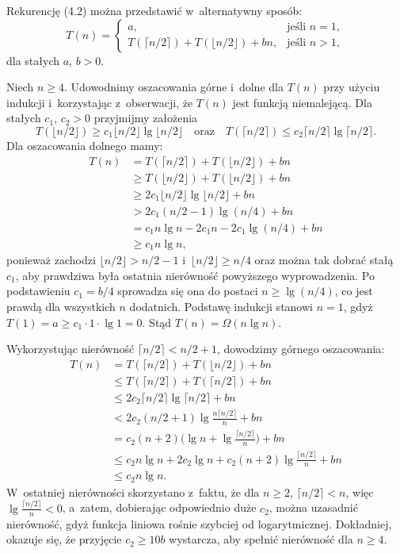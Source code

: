 \exercise %
Rekurencję (4.2) można przedstawić w~alternatywny sposób:
\[
	T(n) =
	\begin{cases}
		a, & \text{jeśli $n=1$}, \\
		T(\lceil n/2\rceil)+T(\lfloor n/2\rfloor)+bn, & \text{jeśli $n>1$},
	\end{cases}
\]
dla stałych $a$, $b>0$.

Niech $n\ge4$.
Udowodnimy oszacowania górne i~dolne dla $T(n)$ przy użyciu indukcji i~korzystając z~obserwacji, że $T(n)$ jest funkcją niemalejącą.
Dla stałych $c_1$, $c_2>0$ przyjmijmy założenia
\[
	T(\lfloor n/2\rfloor) \ge c_1\lfloor n/2\rfloor\lg\lfloor n/2\rfloor \quad\text{oraz}\quad T(\lceil n/2\rceil) \le c_2\lceil n/2\rceil\lg\lceil n/2\rceil.
\]
Dla oszacowania dolnego mamy:
\begin{align*}
	T(n) &= T(\lceil n/2\rceil)+T(\lfloor n/2\rfloor)+bn \\
	&\ge T(\lfloor n/2\rfloor)+T(\lfloor n/2\rfloor)+bn \\
	&\ge 2c_1\lfloor n/2\rfloor\lg\lfloor n/2\rfloor+bn \\
	&> 2c_1(n/2-1)\lg(n/4)+bn \\
	&= c_1n\lg n-2c_1n-2c_1\!\lg(n/4)+bn \\
	&\ge c_1n\lg n,
\end{align*}
ponieważ zachodzi $\lfloor n/2\rfloor>n/2-1$ i~$\lfloor n/2\rfloor\ge n/4$ oraz można tak dobrać stałą $c_1$, aby prawdziwa była ostatnia nierówność powyższego wyprowadzenia.
Po podstawieniu $c_1=b/4$ sprowadza się ona do postaci $n\ge\lg(n/4)$, co jest prawdą dla wszystkich $n$ dodatnich.
Podstawę indukcji stanowi $n=1$, gdyż $T(1)=a\ge c_1\cdot 1\cdot\lg1=0$.
Stąd $T(n)=\Omega(n\lg n)$.

Wykorzystując nierówność $\lceil n/2\rceil<n/2+1$, dowodzimy górnego oszacowania:
\begin{align*}
	T(n) &= T(\lceil n/2\rceil)+T(\lfloor n/2\rfloor)+bn \\
	&\le T(\lceil n/2\rceil)+T(\lceil n/2\rceil)+bn \\
	&\le 2c_2\lceil n/2\rceil\lg\lceil n/2\rceil+bn \\
	&< 2c_2(n/2+1)\lg\frac{n\lceil n/2\rceil}{n}+bn \\
	&= c_2(n+2)\biggl(\lg n+\lg\frac{\lceil n/2\rceil}{n}\biggr)+bn \\
	&\le c_2n\lg n+2c_2\lg n+c_2(n+2)\lg\frac{\lceil n/2\rceil}{n}+bn \\
	&\le c_2n\lg n.
\end{align*}
W~ostatniej nierówności skorzystano z~faktu, że dla $n\ge2$, $\lceil n/2\rceil<n$, więc $\lg\frac{\lceil n/2\rceil}{n}<0$, a~zatem, dobierając odpowiednio duże $c_2$, można uzasadnić nierówność, gdyż funkcja liniowa rośnie szybciej od logarytmicznej.
Dokładniej, okazuje się, że przyjęcie $c_2\ge10b$ wystarcza, aby spełnić nierówność dla $n\ge4$.

